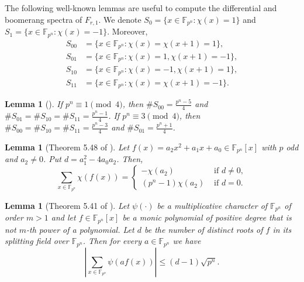 \documentclass[11pt]{article}
\numberwithin{theorem}{section}
\newtheorem{lemma}[theorem]{Lemma}
\newcommand{\Fpn}{\mathbb{F}_{p^n}}
\begin{document}
The following well-known lemmas are useful to compute the differential and boomerang spectra of $F_{r,1}$. We denote $S_0= \{x\in \Fpn : \chi(x)=1\}$ and $S_1=\{x\in \Fpn : \chi(x)=-1\}$. Moreover,
\begin{align*}
	S_{00}&=\{x\in \Fpn : \chi(x)=\chi(x+1)=1\},\\
	S_{01}&=\{x\in \Fpn : \chi(x)=1, \chi(x+1)=-1\},\\
	S_{10}&=\{x\in \Fpn : \chi(x)=-1, \chi(x+1)=1\},\\
	S_{11}&=\{x\in \Fpn : \chi(x)=\chi(x+1)=-1\}.
\end{align*}

\begin{lemma}[\cite{Dic35}]\label{Sset num of elts} If $p^n\equiv 1\pmod{4}$, then $\#S_{00}=\frac{p^n-5}{4}$ and $\#S_{01}=\#S_{10}=\#S_{11}=\frac{p^n-1}{4}$. If $p^n\equiv 3\pmod{4}$, then $\#S_{00}=\#S_{10}=\#S_{11}=\frac{p^n-3}{4}$ and $\#S_{01}=\frac{p^n+1}{4}$.
\end{lemma}




\begin{lemma}[Theorem 5.48 of \cite{LN97}]\label{chi_lemma quad}
	Let $f(x) = a_2x^2 +a_1 x + a_0 \in \Fpn [x]$ with $p$ odd and $a_2 \ne 0$. Put $d=a_1^2-4a_0a_2$. Then,
	\begin{equation*}
		\sum_{x\in \Fpn} \chi(f(x)) = 
		\begin{cases}
			-\chi(a_2) &\text{ if }d\ne 0,\\
			(p^n-1)\chi(a_2) &\text{ if }d = 0.
		\end{cases}
	\end{equation*}
\end{lemma}



\begin{lemma}[Theorem 5.41 of \cite{LN97}]\label{chi_lemma inequal}
	Let $\psi(\cdot)$ be a multiplicative character of $\Fpn$ of order $m>1$ and let $f\in\Fpn[x]$ be a monic polynomial of positive degree that is not $m$-th power of a polynomial. Let $d$ be the number of distinct roots of $f$ in its splitting field over $\Fpn$. Then for every $a\in\Fpn$ we have
	\begin{equation*}
		\left| \sum_{x\in \Fpn} \psi (af(x))\right| \le (d-1)\sqrt{p^n}.
	\end{equation*}
\end{lemma}
\end{document}
